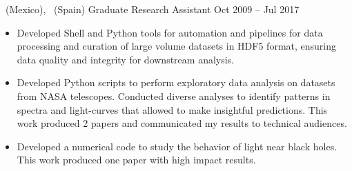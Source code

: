 \cventry{}%
{\UMSNH\ (Mexico), \UVval\ (Spain)}%
{Graduate Research Assistant}%
{Oct 2009 -- Jul 2017}%
{}%
{%
\begin{itemize}
    \item Developed Shell and Python tools for automation and pipelines for data processing and curation of large volume datasets in HDF5 format, ensuring data quality and integrity for downstream analysis.
    \item Developed Python scripts to perform exploratory data analysis on datasets from NASA telescopes. Conducted diverse analyses to identify patterns in spectra and light-curves that allowed to make insightful predictions. This work produced 2 papers and communicated my results to technical audiences.
    \item Developed a numerical code to study the behavior of light near black holes. This work produced one paper with high impact results.
\end{itemize}
}
